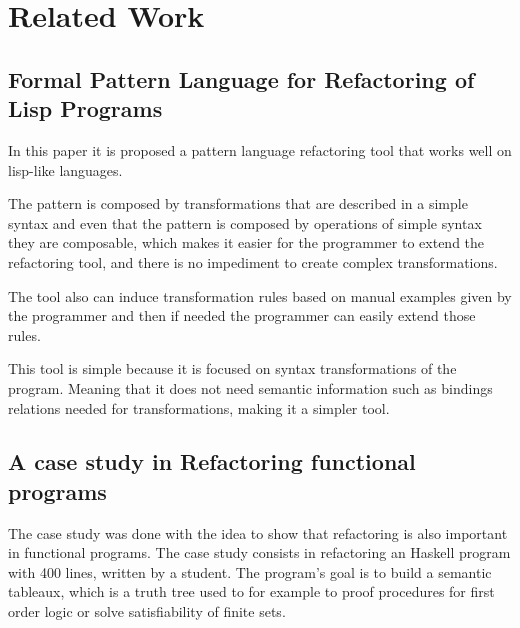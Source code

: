 
% 
% 

\section{Related Work}




\subsection{Formal Pattern Language for Refactoring of Lisp Programs}
In this paper \cite{leitdo2002formal} it is proposed a pattern language refactoring tool that works well on lisp-like languages. 

The pattern is composed by transformations that are described in a simple syntax and even that the pattern is composed by operations of simple syntax they are composable, which makes it easier for the programmer to extend the refactoring tool, and there is no impediment to create complex transformations.

The tool also can induce transformation rules based on manual examples given by the programmer and then if needed the programmer can easily extend those rules.

This tool is simple because it is focused on syntax transformations of the program. Meaning that it does not need semantic information such as bindings relations needed for transformations, making it a simpler tool.



\subsection{A case study in Refactoring functional programs}
The case study \cite{thompson2003case} was done with the idea to show that refactoring is also important in functional programs.
The case study consists in refactoring an Haskell program with 400 lines, written by a student.
The program's goal is to build a semantic tableaux, which is a truth tree used to  for example to proof procedures for first order logic or solve satisfiability of finite sets.

